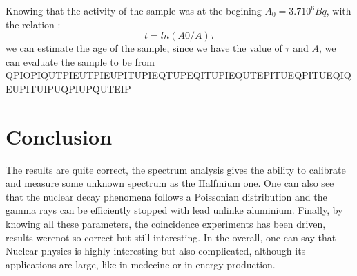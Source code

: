 \documentclass[a4paper,12pt,oneside]{article}
\def \be {\begin{equation}}
\def \ee {\end{equation}}
\begin{document}
	Knowing that the activity of the sample was at the begining $A_0 = 3.7 10^6 Bq$, with the relation :
	\be
		t=ln(A0/A)\tau
	\ee
	we can estimate the age of the sample, since we have the value of $\tau$ and $A$, we can evaluate the sample to be from QPIOPIQUTPIEUTPIEUPITUPIEQTUPEQITUPIEQUTEPITUEQPITUEQIQEUPITUIPUQPIUPQUTEIP 










\section{Conclusion}
The results are quite correct, the spectrum analysis gives the ability to calibrate and measure some unknown spectrum as the Halfmium one. One can also see that the nuclear decay phenomena follows a Poissonian distribution and the gamma rays can be efficiently stopped with lead unlinke aluminium. Finally, by knowing all these parameters, the coincidence experiments has been driven, results werenot so correct but still interesting. In the overall, one can say that Nuclear physics is highly interesting but also complicated, although its applications are large, like in medecine or in energy production.




\begin{thebibliography}{99}
\end{thebibliography}
\end{document}
